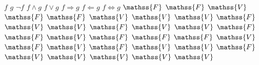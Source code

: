 \startplacetable[location=force,number=no]
  \bTABLE[setups=fTable]
    \bTR\bTD $f$ \eTD\bTD $g$ \eTD\bTD $\lnot f$ \eTD\bTD $f \wedge g$ \eTD\bTD $f \vee g$ \eTD\bTD $f \Rightarrow g$ \eTD\bTD $f \Leftarrow g$ \eTD\bTD $f \Leftrightarrow g$ \eTD\eTR
    \bTR\bTD $\mathss{F}$ \eTD\bTD $\mathss{F}$ \eTD\bTD $\mathss{V}$ \eTD\bTD $\mathss{F}$ \eTD\bTD $\mathss{F}$ \eTD\bTD $\mathss{V}$ \eTD\bTD $\mathss{V}$ \eTD\bTD $\mathss{V}$ \eTD\eTR
    \bTR\bTD $\mathss{F}$ \eTD\bTD $\mathss{V}$ \eTD\bTD $\mathss{V}$ \eTD\bTD $\mathss{F}$ \eTD\bTD $\mathss{V}$ \eTD\bTD $\mathss{V}$ \eTD\bTD $\mathss{F}$ \eTD\bTD $\mathss{F}$ \eTD\eTR
    \bTR\bTD $\mathss{V}$ \eTD\bTD $\mathss{F}$ \eTD\bTD $\mathss{F}$ \eTD\bTD $\mathss{F}$ \eTD\bTD $\mathss{V}$ \eTD\bTD $\mathss{F}$ \eTD\bTD $\mathss{V}$ \eTD\bTD $\mathss{F}$ \eTD\eTR
    \bTR\bTD $\mathss{V}$ \eTD\bTD $\mathss{V}$ \eTD\bTD $\mathss{F}$ \eTD\bTD $\mathss{V}$ \eTD\bTD $\mathss{V}$ \eTD\bTD $\mathss{V}$ \eTD\bTD $\mathss{V}$ \eTD\bTD $\mathss{V}$ \eTD\eTR
  \eTABLE
\stopplacetable

